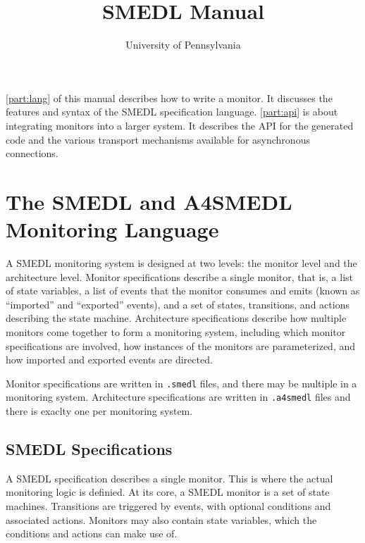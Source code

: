 \documentclass[paper=letter]{scrreport}
\title{SMEDL Manual}
\author{University of Pennsylvania}
\begin{document}
\maketitle


\autoref{part:lang} of this manual describes how to write a monitor. It discusses the features and syntax of the SMEDL specification language. \autoref{part:api} is about integrating monitors into a larger system. It describes the API for the generated code and the various transport mechanisms available for asynchronous connections.

\part{The SMEDL and A4SMEDL Monitoring Language}
\label{part:lang}

A SMEDL monitoring system is designed at two levels: the monitor level and
the architecture level. Monitor specifications describe a single monitor, that
is, a list of state variables, a list of events that the monitor consumes and
emits (known as ``imported'' and ``exported'' events), and a set of states,
transitions, and actions describing the state machine. Architecture
specifications describe how multiple monitors come together to form a
monitoring system, including which monitor specifications are involved, how
instances of the monitors are parameterized, and how imported and exported
events are directed.

Monitor specifications are written in \verb|.smedl| files, and there may be
multiple in a monitoring system. Architecture specifications are written in
\verb|.a4smedl| files and there is exaclty one per monitoring system.

\chapter{SMEDL Specifications}
\label{ch:smedl}

A SMEDL specification describes a single monitor. This is where the actual
monitoring logic is definied. At its core, a SMEDL monitor is a set of state
machines. Transitions are triggered by events, with optional conditions and
associated actions. Monitors may also contain state variables, which the
conditions and actions can make use of.




\end{document}
